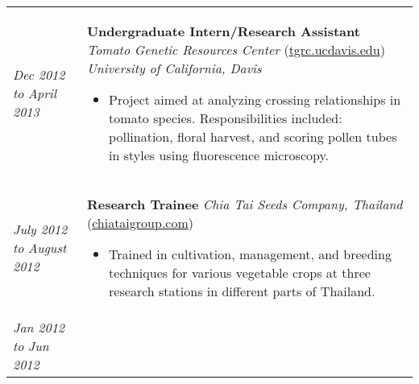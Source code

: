 ﻿\documentclass[a4paper]{article}
\begin{document}
\begin{tabular}{p{3cm} p{14cm}}
%
\\
%
\vspace{0pt} 
\textit{Dec 2012}\newline
\textit{to}\newline
\textit{April 2013}\newline
&
\vspace{0pt}
\textbf{Undergraduate Intern/Research Assistant}\newline
\textit{Tomato Genetic Resources Center} (\href{http://tgrc.ucdavis.edu/}{tgrc.ucdavis.edu})\newline
\textit{University of California, Davis}
\begin{itemize}[noitemsep,topsep=0pt]
  \item Project aimed at analyzing crossing relationships in tomato species. Responsibilities included: pollination, floral harvest, and scoring pollen tubes in styles using fluorescence microscopy.
\end{itemize}
%
\\
%
\vspace{0pt} 
\textit{July 2012}\newline
\textit{to}\newline
\textit{August 2012}\newline
&
\vspace{0pt}
\textbf{Research Trainee}\newline
\textit{Chia Tai Seeds Company, Thailand} (\href{http://www.chiataigroup.com/AboutUs.aspx}{chiataigroup.com})
\begin{itemize}[noitemsep,topsep=0pt]
  \item Trained in cultivation, management, and breeding techniques for various vegetable crops at three research stations in different parts of Thailand.
\end{itemize}
%
\\
%
\vspace{0pt} 
\textit{Jan 2012}\newline
\textit{to}\newline
\textit{Jun 2012}\newline
&
\vspace{0pt}


\end{tabular}
\end{document}
